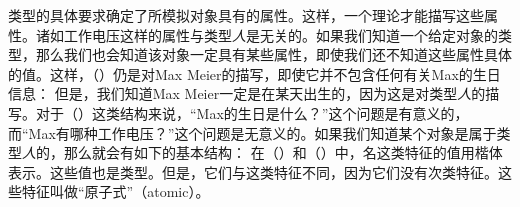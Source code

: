 类型的具体要求确定了所模拟对象具有的属性。这样，一个理论才能描写这些属性。诸如\textsc{工作电压}这样的属性与类型\textit{人}是无关的。如果我们知道一个给定对象的类型，那么我们也会知道该对象一定具有某些属性，即使我们还不知道这些属性具体的值。这样，（）仍是对Max Meier的描写，即使它并不包含任何有关Max的生日信息：
\ea
{}
\z
但是，我们知道Max Meier一定是在某天出生的，因为这是对类型\textit{人}的描写。对于（）这类结构来说，“Max的生日是什么？”这个问题是有意义的，而“Max有哪种工作电压？”这个问题是无意义的。如果我们知道某个对象是属于类型\textit{人}的，那么就会有如下的基本结构：
\ea
{}
\z
在（）和（）中，\textsc{名}这类特征的值用楷体表示。这些值也是类型。但是，它们与这类特征不同，因为它们没有次类特征。这些特征叫做“原子式”（atomic）。

